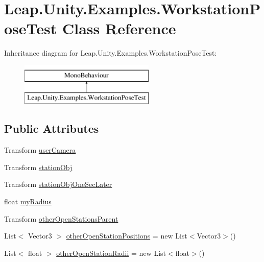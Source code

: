 \hypertarget{class_leap_1_1_unity_1_1_examples_1_1_workstation_pose_test}{}\section{Leap.\+Unity.\+Examples.\+Workstation\+Pose\+Test Class Reference}
\label{class_leap_1_1_unity_1_1_examples_1_1_workstation_pose_test}
Inheritance diagram for Leap.\+Unity.\+Examples.\+Workstation\+Pose\+Test\+:\begin{figure}[H]
\begin{center}
\leavevmode
\includegraphics[height=2.000000cm]{class_leap_1_1_unity_1_1_examples_1_1_workstation_pose_test}
\end{center}
\end{figure}
\subsection*{Public Attributes}
\begin{DoxyCompactItemize}
\item 
Transform \mbox{\hyperlink{class_leap_1_1_unity_1_1_examples_1_1_workstation_pose_test_ab3438a13f7ef73ffaf14a16247bd2984}{user\+Camera}}
\item 
Transform \mbox{\hyperlink{class_leap_1_1_unity_1_1_examples_1_1_workstation_pose_test_aad6f2a5f1183a6e3af63ab5903022580}{station\+Obj}}
\item 
Transform \mbox{\hyperlink{class_leap_1_1_unity_1_1_examples_1_1_workstation_pose_test_abd0d99188368a35b76f775292dc9971a}{station\+Obj\+One\+Sec\+Later}}
\item 
float \mbox{\hyperlink{class_leap_1_1_unity_1_1_examples_1_1_workstation_pose_test_a151f7b187808924fa59bade2cb23a7c2}{my\+Radius}}
\item 
Transform \mbox{\hyperlink{class_leap_1_1_unity_1_1_examples_1_1_workstation_pose_test_a547a8cc27ec95c7a590159c352fa8abb}{other\+Open\+Stations\+Parent}}
\item 
List$<$ Vector3 $>$ \mbox{\hyperlink{class_leap_1_1_unity_1_1_examples_1_1_workstation_pose_test_af1ab0e66c8343138b624634f38931347}{other\+Open\+Station\+Positions}} = new List$<$Vector3$>$()
\item 
List$<$ float $>$ \mbox{\hyperlink{class_leap_1_1_unity_1_1_examples_1_1_workstation_pose_test_ac6fea7d123794ea1f85a2e375f97ab1e}{other\+Open\+Station\+Radii}} = new List$<$float$>$()
\end{DoxyCompactItemize}


